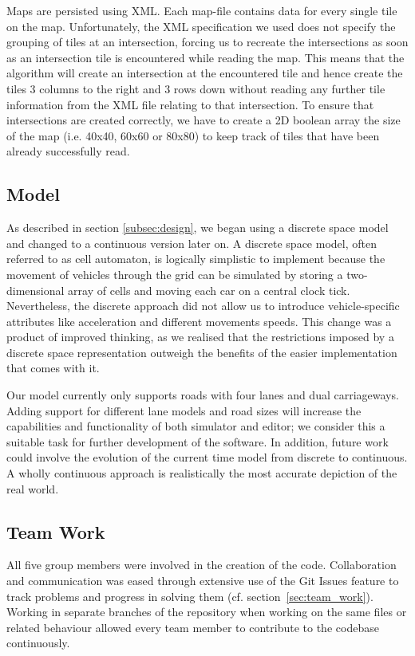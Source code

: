 Maps are persisted using XML. Each map-file contains data for every single tile on the map. Unfortunately, the XML specification we used does not specify the grouping of tiles at an intersection, forcing us to recreate the intersections as soon as an intersection tile is encountered while reading the map. This means that the algorithm will create an intersection at the encountered tile and hence create the tiles 3 columns to the right and 3 rows down without reading any further tile information from the XML file relating to that intersection. To ensure that intersections are created correctly, we have to create a 2D boolean array the size of the map (i.e. 40x40, 60x60 or 80x80) to keep track of tiles that have been already successfully read.

\subsection*{Model}
As described in section \ref{subsec:design}, we began using a discrete space model and changed to a continuous version later on. A discrete space model, often referred to as cell automaton, is logically simplistic to implement because the movement of vehicles through the grid can be simulated by storing a two-dimensional array of cells and moving each car on a central clock tick. Nevertheless, the discrete approach did not allow us to introduce vehicle-specific attributes like acceleration and different movements speeds.
 This change was a product of improved thinking, as we realised that the restrictions imposed by a discrete space representation outweigh the benefits of the easier implementation that comes with it.

Our model currently only supports roads with four lanes and dual carriageways. Adding support for different lane models and road sizes will increase the capabilities and functionality of both simulator and editor; we consider this a suitable task for further development of the software. In addition, future work could involve the evolution of the current time model from discrete to continuous. A wholly continuous approach is realistically the most accurate depiction of the real world. 

\subsection*{Team Work}
All five group members were involved in the creation of the code. Collaboration and communication was eased through extensive use of the Git Issues feature to track problems and progress in solving them (cf. section~\ref{sec:team_work}). Working in separate branches of the repository when working on the same files or related behaviour allowed every team member to contribute to the codebase continuously.  

